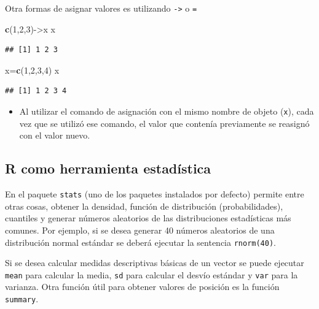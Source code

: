 \documentclass[]{book}
\newenvironment{Shaded}{\begin{snugshade}}{\end{snugshade}}
\newcommand{\KeywordTok}[1]{\textcolor[rgb]{0.13,0.29,0.53}{\textbf{#1}}}
\newcommand{\DecValTok}[1]{\textcolor[rgb]{0.00,0.00,0.81}{#1}}
\newcommand{\NormalTok}[1]{#1}
\newenvironment{rmdblock}[1]
{\begin{shaded*}
		\begin{itemize}
			\renewcommand{\labelitemi}{
				\raisebox{-.7\height}[0pt][0pt]{
					{\setkeys{Gin}{width=3em,keepaspectratio}\texttt{[image: images/\#1]}}
				}
			}
			\item
		}
		{
		\end{itemize}
	\end{shaded*}
}
\newenvironment{rmdnote}
{\begin{rmdblock}{note}}
	{\end{rmdblock}}
\begin{document}
Otra formas de asignar valores es utilizando \texttt{-\textgreater{}} o
\texttt{=}

\begin{Shaded}
\begin{Highlighting}[]
\KeywordTok{c}\NormalTok{(}\DecValTok{1}\NormalTok{,}\DecValTok{2}\NormalTok{,}\DecValTok{3}\NormalTok{)->x}
\NormalTok{x}
\end{Highlighting}
\end{Shaded}

\begin{verbatim}
## [1] 1 2 3
\end{verbatim}

\begin{Shaded}
\begin{Highlighting}[]
\NormalTok{x=}\KeywordTok{c}\NormalTok{(}\DecValTok{1}\NormalTok{,}\DecValTok{2}\NormalTok{,}\DecValTok{3}\NormalTok{,}\DecValTok{4}\NormalTok{)}
\NormalTok{x}
\end{Highlighting}
\end{Shaded}

\begin{verbatim}
## [1] 1 2 3 4
\end{verbatim}

\begin{rmdnote}
Al utilizar el comando de asignación con el mismo nombre de objeto
(\texttt{x}), cada vez que se utilizó ese comando, el valor que contenía
previamente se reasignó con el valor nuevo.
\end{rmdnote}

\hypertarget{r-como-herramienta-estadistica}{%
\subsection{R como herramienta
estadística}\label{r-como-herramienta-estadistica}}

En el paquete \texttt{stats} (uno de los paquetes instalados por
defecto) permite entre otras cosas, obtener la densidad, función de
distribución (probabilidades), cuantiles y generar números aleatorios de
las distribuciones estadísticas más comunes. Por ejemplo, si se desea
generar 40 números aleatorios de una distribución normal estándar se
deberá ejecutar la sentencia \texttt{rnorm(40)}.

Si se desea calcular medidas descriptivas básicas de un vector se puede
ejecutar \texttt{mean} para calcular la media, \texttt{sd} para calcular
el desvío estándar y \texttt{var} para la varianza. Otra función útil
para obtener valores de posición es la función \texttt{summary}.
\end{document}

